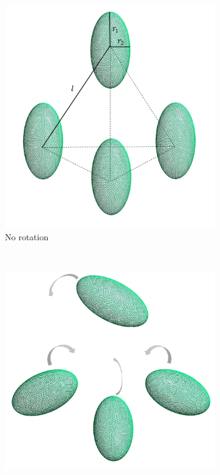 \begin{figure}[H]
    \begin{subfigure}{\linewidth}
        \centering
        \includegraphics[scale = 0.4]{figures/4_ellip}
        \caption{No rotation}
        \label{No rotation 4}
        \end{subfigure}\\[1ex]
    \begin{subfigure}{.5\linewidth}
    \centering
    \includegraphics[scale = 0.09]{figures/4_ellip_in}

\end{subfigure}
\end{figure}

